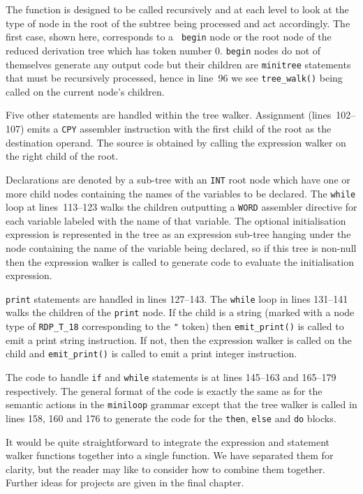 The function is designed to be called recursively and at each level to
look at the type of node in the root of the subtree being processed and
act accordingly. The first case, shown here, corresponds to a {\tt
begin} node or the root node of the reduced derivation tree which has
token number 0. {\tt begin} nodes do not of themselves generate any
output code but their children are {\tt minitree} statements that must
be recursively processed, hence in line~96 we see \verb|tree_walk()|
being called on the current node's children.

Five other statements are handled within the tree walker. Assignment
(lines~102--107) emits a {\tt CPY} assembler instruction with the first
child of the root as the destination  operand. The source is obtained by
calling the expression walker on the right child of the root.

Declarations are denoted by a sub-tree with an {\tt INT} root node which
have one or more child nodes containing the names of the variables to be
declared. The {\tt while} loop at lines~113--123 walks the children
outputting a {\tt WORD} assembler directive for each variable labeled
with the name of that variable. The optional initialisation expression
is represented in the tree as an expression sub-tree hanging under the
node containing the name of the variable being declared, so if this tree
is non-null then  the expression walker is called to generate code to
evaluate the initialisation expression.

{\tt print} statements are handled in lines 127--143. The {\tt while}
loop in lines 131--141 walks the children of the {\tt print} node. If
the child is a string (marked with a node type of \verb|RDP_T_18|
corresponding to the \verb|"| token) then \verb|emit_print()| is called
to emit a print string instruction. If not, then the expression walker
is called on the child and \verb|emit_print()| is called to emit a print integer
instruction.

The code to handle {\tt if} and {\tt while} statements is at lines
145--163 and 165--179 respectively. The general format of the code is
exactly the same as for the semantic actions in the {\tt miniloop}
grammar except that the tree walker is called in lines 158, 160 and 176
to generate the code for the {\tt then}, {\tt else} and {\tt do} blocks.

It would be quite straightforward to integrate the expression and
statement walker functions together into a single function. We have
separated them for clarity, but the reader may like to  consider how to
combine them together. Further ideas for projects are given in the final
chapter.


